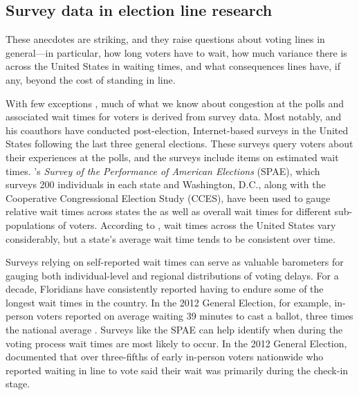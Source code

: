 \documentclass[12pt,titlepage]{article}
\begin{document}
\subsection*{Survey data in election line research}

These anecdotes are striking, and they raise questions about voting
lines in general---in particular, how long voters have to wait, how
much variance there is across the United States in waiting times, and
what consequences lines have, if any, beyond the cost of standing in
line.

With few exceptions \citep[e.g.,][]{spencermarkovits:renege,
  herronsmith:hanoverstudy, pettigrew:longlinesminorityprecincts},
much of what we know about congestion at the polls and associated wait
times for voters is derived from survey data. Most notably,
\citet{stewart:waitingtovote2012} and his coauthors have conducted
post-election, Internet-based surveys in the United States following
the last three general elections.  These surveys query voters about
their experiences at the polls, and the surveys include items on
estimated wait times.  \citeauthor{stewart:waitingtovote2012}'s
\emph{Survey of the Performance of American Elections} (SPAE), which
surveys 200 individuals in each state and Washington, D.C., along with
the Cooperative Congressional Election Study (CCES), have been used to
gauge relative wait times across states the as well as overall wait
times for different sub-populations of voters.  According to
\citeauthor{stewart:waitingtovote2012}, wait times across the United
States vary considerably, but a state's average wait time tends to be
consistent over time.

Surveys relying on self-reported wait times can serve as valuable
barometers for gauging both individual-level and regional
distributions of voting delays.  For a decade, Floridians have
consistently reported having to endure some of the longest wait times
in the country. In the 2012 General Election, for example, in-person
voters reported on average waiting 39 minutes to cast a ballot, three
times the national average \citep{stewart:waitingtovote2012}.  Surveys
like the SPAE can help identify when during the voting process wait
times are most likely to occur.  In the 2012 General Election,
\citeauthor{stewart:waitingtovote2012} documented that over
three-fifths of early in-person voters nationwide who reported waiting
in line to vote said their wait was primarily during the check-in
stage.
\end{document}
